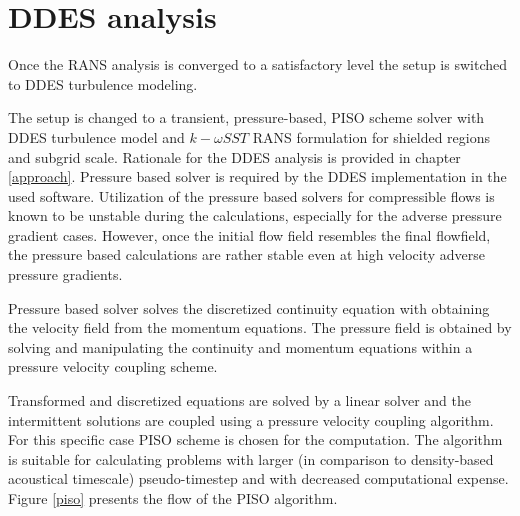 \section{DDES analysis}
Once the RANS analysis is converged to a satisfactory level the setup is switched to DDES turbulence modeling.

The setup is changed to a transient, pressure-based, PISO scheme solver with DDES turbulence model and $k-\omega SST$ RANS formulation for shielded regions and subgrid scale. Rationale for the DDES analysis is provided in chapter \ref{approach}. Pressure based solver is required by the DDES implementation in the used software. Utilization of the pressure based solvers for compressible flows is known to be unstable during the calculations, especially for the adverse pressure gradient cases. However, once the initial flow field resembles the final flowfield, the pressure based calculations are rather stable even at high velocity adverse pressure gradients.

Pressure based solver solves the discretized continuity equation with obtaining the velocity field from the momentum equations. The pressure field is obtained by solving and manipulating the continuity and momentum equations within a pressure velocity coupling scheme.

%
%

Transformed and discretized equations are solved by a linear solver and the intermittent solutions are coupled using a pressure velocity coupling algorithm. For this specific case PISO scheme is chosen for the computation. The algorithm is suitable for calculating problems with larger (in comparison to density-based acoustical timescale) pseudo-timestep and with decreased computational expense. Figure \ref{piso} presents the flow of the PISO algorithm. 


